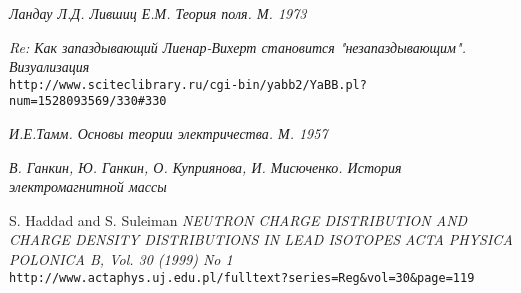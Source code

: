 \documentclass{article}
\begin{document}
\begin{thebibliography}{99}

\textit{Ландау Л.Д. Лившиц Е.М. Теория поля. М. 1973}

\textit{Re: Как запаздывающий Лиенар-Вихерт становится "незапаздывающим". Визуализация}
\\\texttt{http://www.sciteclibrary.ru/cgi-bin/yabb2/YaBB.pl?num=1528093569/330\#330}

\textit{И.Е.Тамм. Основы теории электричества. М. 1957}

\textit{В. Ганкин, Ю. Ганкин, О. Куприянова, И. Мисюченко. История электромагнитной массы}


S. Haddad and S. Suleiman
\textit{NEUTRON CHARGE DISTRIBUTION AND CHARGE DENSITY DISTRIBUTIONS IN LEAD ISOTOPES}
\textit{ACTA PHYSICA POLONICA B, Vol. 30 (1999) No 1}
\\\texttt{http://www.actaphys.uj.edu.pl/fulltext?series=Reg\&vol=30\&page=119}

\end{thebibliography}
\end{document}
